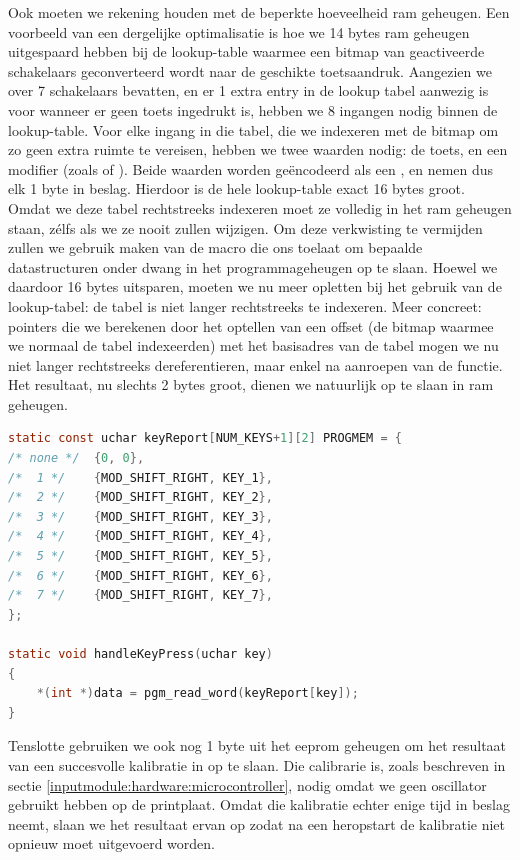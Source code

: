 Ook moeten we rekening houden met de beperkte hoeveelheid \ac{ram} geheugen. Een voorbeeld van een dergelijke optimalisatie is hoe we 14 bytes \ac{ram} geheugen uitgespaard hebben bij de lookup-table waarmee een bitmap van geactiveerde schakelaars geconverteerd wordt naar de geschikte toetsaandruk. Aangezien we over 7 schakelaars bevatten, en er 1 extra entry in de lookup tabel aanwezig is voor wanneer er geen toets ingedrukt is, hebben we 8 ingangen nodig binnen de lookup-table. Voor elke ingang in die tabel, die we indexeren met de bitmap om zo geen extra ruimte te vereisen, hebben we twee waarden nodig: de toets, en een modifier (zoals  of ). Beide waarden worden geëncodeerd als een , en nemen dus elk 1 byte in beslag. Hierdoor is de hele lookup-table exact 16 bytes groot. Omdat we deze tabel rechtstreeks indexeren moet ze volledig in het \ac{ram} geheugen staan, zélfs als we ze nooit zullen wijzigen. Om deze verkwisting te vermijden zullen we gebruik maken van de  macro die ons toelaat om bepaalde datastructuren onder dwang in het programmageheugen op te slaan. Hoewel we daardoor 16 bytes uitsparen, moeten we nu meer opletten bij het gebruik van de lookup-tabel: de tabel is niet langer rechtstreeks te indexeren. Meer concreet: pointers die we berekenen door het optellen van een offset (de bitmap waarmee we normaal de tabel indexeerden) met het basisadres van de tabel mogen we nu niet langer rechtstreeks dereferentieren, maar enkel na aanroepen van de  functie. Het resultaat, nu slechts 2 bytes groot, dienen we natuurlijk op te slaan in \ac{ram} geheugen.

\begin{lstlisting}[language=C, float, caption=Optimalisatie van de lookup-table.]
static const uchar keyReport[NUM_KEYS+1][2] PROGMEM = {
/* none */  {0, 0},
/*  1 */    {MOD_SHIFT_RIGHT, KEY_1},
/*  2 */    {MOD_SHIFT_RIGHT, KEY_2},
/*  3 */    {MOD_SHIFT_RIGHT, KEY_3},
/*  4 */    {MOD_SHIFT_RIGHT, KEY_4},
/*  5 */    {MOD_SHIFT_RIGHT, KEY_5},
/*  6 */    {MOD_SHIFT_RIGHT, KEY_6},
/*  7 */    {MOD_SHIFT_RIGHT, KEY_7},
};

static void handleKeyPress(uchar key)
{
    *(int *)data = pgm_read_word(keyReport[key]);
}
\end{lstlisting}

Tenslotte gebruiken we ook nog 1 byte uit het \ac{eeprom} geheugen om het resultaat van een succesvolle kalibratie in op te slaan. Die calibrarie is, zoals beschreven in sectie \ref{inputmodule:hardware:microcontroller}, nodig omdat we geen oscillator gebruikt hebben op de printplaat. Omdat die kalibratie echter enige tijd in beslag neemt, slaan we het resultaat ervan op zodat na een heropstart de kalibratie niet opnieuw moet uitgevoerd worden.

